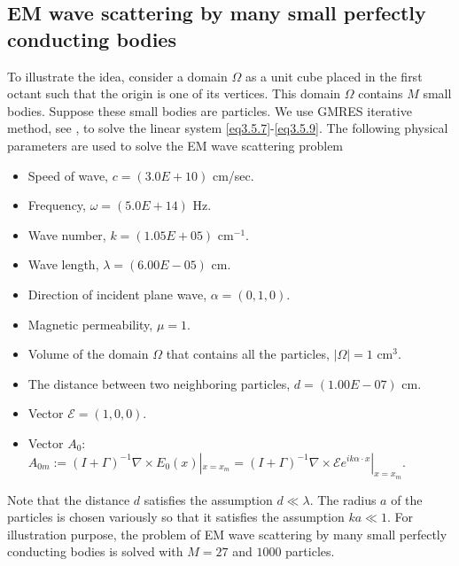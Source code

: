 \documentclass[12pt]{article}
\numberwithin{equation}{section}
\begin{document}
\subsection{EM wave scattering by many small perfectly conducting bodies}
To illustrate the idea, consider a domain $\Omega$ as a unit cube placed in the first octant such that the origin is one of its vertices. This domain $\Omega$ contains $M$ small bodies. Suppose these small bodies are particles. We use GMRES iterative method, see \cite{GMRES}, to solve the linear system \eqref{eq3.5.7}-\eqref{eq3.5.9}. The following physical parameters are used to solve the EM wave scattering problem
\begin{itemize}
     \item Speed of wave, $c=(3.0E+10)$ cm/sec.
     \item Frequency, $\omega=(5.0E+14)$ Hz.
     \item Wave number, $k =(1.05E+05)$ cm$^{-1}$.
     \item Wave length, $\lambda= (6.00E-05)$ cm.
     \item Direction of incident plane wave, $\alpha = (0,  1,  0)$.
     \item Magnetic permeability, $\mu = 1$.
     \item Volume of the domain $\Omega$ that contains all the particles, $|\Omega| = 1$ cm$^3$.
     \item The distance between two neighboring particles, $d = (1.00E-07)$ cm.
     \item Vector $\mathcal{E} = (1,  0,  0)$.
     \item Vector $A_0$: $A_{0m}:=(I+\Gamma)^{-1}\nabla \times E_0(x)|_{x=x_m}=(I+\Gamma)^{-1}\nabla \times \mathcal{E} e^{ik\alpha\cdot x}|_{x=x_m}$.
\end{itemize}
Note that the distance $d$ satisfies the assumption $d \ll \lambda$. The radius $a$ of the particles is chosen variously so that it satisfies the assumption $ka \ll 1$. For illustration purpose, the problem of EM wave scattering by many small perfectly conducting bodies is solved with $M=27$ and $1000$ particles.
\end{document}
